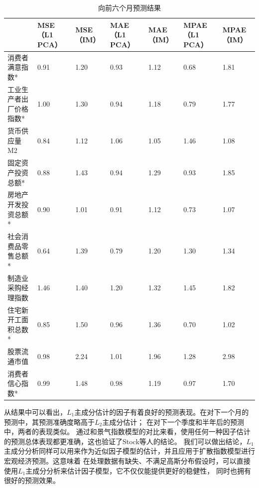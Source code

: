 \begin{table}[H]
    \small
    \centering
    \caption{向前六个月预测结果}
    \label{outcome33}
    \begin{tabularx}{\textwidth}{lXXXXXX}
    \toprule
                 &  MSE（L1 PCA） &  MSE（IM）&  MAE（L1 PCA） &  MAE（IM） &  MPAE（L1 PCA） &  MPAE（IM） \\ \midrule
                 消费者满意指数*     & 0.91            & 1.20        & 0.93            & 1.12        & 0.68             & 1.81         \\
    工业生产者出厂价格指数* & 1.00            & 1.30        & 0.94            & 1.18        & 0.79             & 1.77         \\
    货币供应量M2      & 0.84            & 1.12        & 1.06            & 1.05        & 1.46             & 1.08         \\
    固定资产投资总额*  & 0.88            & 1.43        & 0.94            & 1.29        & 0.93             & 1.85         \\
    房地产开发投资总额* & 0.90            & 1.01        & 0.91            & 1.12        & 0.73             & 1.07         \\
    社会消费品零售总额* & 0.64            & 1.39        & 0.79            & 1.20        & 1.30             & 1.34         \\
    制造业采购经理指数   & 1.46            & 1.40        & 1.20            & 1.32        & 1.45             & 1.82         \\
    住宅新开工面积总数*  & 0.85            & 1.50        & 0.96            & 1.36        & 0.70             & 1.02         \\
    股票流通市值   & 0.98            & 2.24        & 1.01            & 1.96        & 1.28             & 2.98         \\
    消费者信心指数*     & 0.99            & 1.48        & 0.98            & 1.19        & 0.97             & 1.70         \\ \bottomrule
    \end{tabularx}
\end{table}

从结果中可以看出，$L_1$主成分估计的因子有着良好的预测表现。在对下一个月的预测中，其预测准确度略高于$L_2$主成分估计；
在对下一个季度和半年后的预测中，两者的表现类似。
通过和景气指数模型的对比来看，使用任何一种因子估计的预测总体表现都更准确，这也验证了Stock等人的结论\cite{stock2002forecasting}。
我们可以做出结论，$L_1$主成分分析同样可以用来作为近似因子模型的估计，并且应用于扩散指数模型进行宏观经济预测。这意味着
在处理数据有缺失、不满足高斯分布假设时，可以直接使用$L_1$主成分分析来估计因子模型，它不仅仅能提供更好的稳健性，
同时也拥有很好的预测效果。

